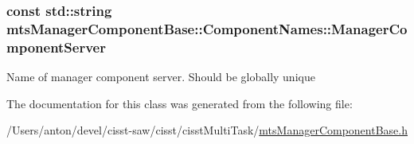 \subsubsection[{Manager\+Component\+Server}]{\setlength{\rightskip}{0pt plus 5cm}const std\+::string mts\+Manager\+Component\+Base\+::\+Component\+Names\+::\+Manager\+Component\+Server\hspace{0.3cm}{\ttfamily [static]}}\label{classmts_manager_component_base_1_1_component_names_ac0d5e1fbe029076826e635b1d309cb41}
Name of manager component server. Should be globally unique 

The documentation for this class was generated from the following file\+:\begin{DoxyCompactItemize}
\item 
/\+Users/anton/devel/cisst-\/saw/cisst/cisst\+Multi\+Task/\hyperlink{mts_manager_component_base_8h}{mts\+Manager\+Component\+Base.\+h}\end{DoxyCompactItemize}
